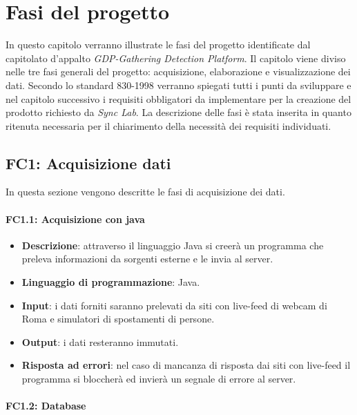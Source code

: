 \chapter{Fasi del progetto}
In questo capitolo verranno illustrate le fasi del progetto identificate dal capitolato d'appalto \textit{GDP-Gathering Detection Platform}. Il capitolo viene diviso nelle tre fasi generali del progetto: acquisizione, elaborazione e visualizzazione dei dati. Secondo lo standard 830-1998 verranno spiegati tutti i punti da sviluppare e nel capitolo successivo i requisiti obbligatori da implementare per la creazione del prodotto richiesto da \textit{Sync Lab}. La descrizione delle fasi è stata inserita in quanto ritenuta necessaria per il chiarimento della necessità dei requisiti individuati. %

\section{FC1: Acquisizione dati}%
In questa sezione vengono descritte le fasi di acquisizione dei dati.

\subsubsection{FC1.1: Acquisizione con java}

\begin{itemize}
	\item \textbf{Descrizione}: attraverso il linguaggio Java si creerà un programma che preleva informazioni da sorgenti esterne e le invia al server.
	\item \textbf{Linguaggio di programmazione}: Java.
	\item \textbf{Input}: i dati forniti saranno prelevati da siti con live-feed di webcam di Roma e simulatori di spostamenti di persone.
	\item \textbf{Output}: i dati resteranno immutati.
	\item \textbf{Risposta ad errori}: nel caso di mancanza di risposta dai siti con live-feed il programma si bloccherà ed invierà un segnale di errore al server.
\end{itemize}


\subsubsection{FC1.2: Database}

